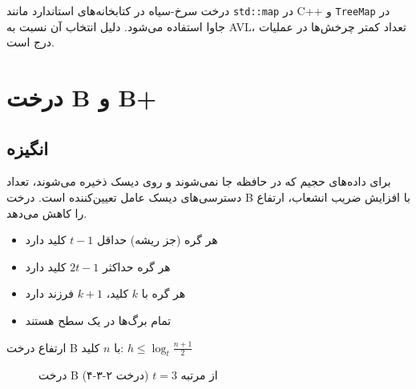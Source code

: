 \documentclass{matinbook}
\begin{document}
    \begin{remark}
        درخت سرخ-سیاه در کتابخانه‌های استاندارد
        مانند \texttt{std::map} در C++ و
        \texttt{TreeMap} در جاوا استفاده می‌شود.
        دلیل انتخاب آن نسبت به AVL،
        تعداد کمتر چرخش‌ها در عملیات درج است.
        \label{rem:rb-vs-avl}
    \end{remark}
    
    \section{درخت B و B+}
    
    \subsection{انگیزه}
    
    برای داده‌های حجیم که در حافظه جا نمی‌شوند
    و روی دیسک ذخیره می‌شوند،
    تعداد دسترسی‌های دیسک عامل تعیین‌کننده است.
    درخت B با افزایش ضریب انشعاب،
    ارتفاع را کاهش می‌دهد.
    
    \begin{definition}
        \begin{itemize}
            \item هر گره (جز ریشه) حداقل $t-1$ کلید دارد
            \item هر گره حداکثر $2t-1$ کلید دارد
            \item هر گره با $k$ کلید، $k+1$ فرزند دارد
            \item تمام برگ‌ها در یک سطح هستند
        \end{itemize}
        \label{def:b-tree}
    \end{definition}
    
    ارتفاع درخت B با $n$ کلید:
    $h \leq \log_{t} \frac{n+1}{2}$
    
    \begin{figure}[h]
        \centering
        \begin{latin}
        \end{latin}
        \caption{درخت B از مرتبه $t=3$ (درخت ۲-۳-۴)}
        \label{fig:b-tree}
    \end{figure}
    
\end{document}
